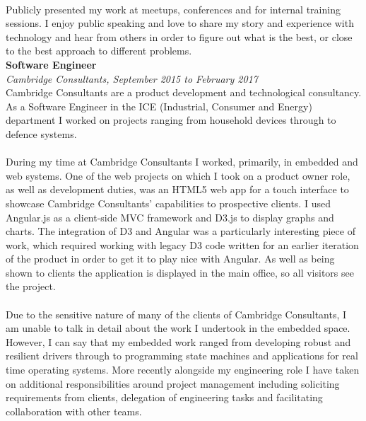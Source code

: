 \documentclass{article}
\begin{document}
\begin{flushleft}
\paragraph{} Publicly presented my work at meetups, conferences and for internal training sessions. I enjoy public speaking and love to share my story and experience with technology and hear from others in order to figure out what is the best, or close to the best approach to different problems.\\[10pt]

\textbf{Software Engineer}\\
\textit{Cambridge Consultants, September 2015 to February 2017}\\[5pt]
Cambridge Consultants are a product development and technological consultancy. As a Software Engineer in the ICE (Industrial, Consumer and Energy) department I worked on projects ranging from household devices through to defence systems.

\paragraph{}During my time at Cambridge Consultants I worked, primarily, in embedded and web systems. One of the web projects on which I took on a product owner role, as well as development duties, was an HTML5 web app for a touch interface to showcase Cambridge Consultants' capabilities to prospective clients. I used Angular.js as a client-side MVC framework and D3.js to display graphs and charts. The integration of D3 and Angular was a particularly interesting piece of work, which required working with legacy D3 code written for an earlier iteration of the product in order to get it to play nice with Angular. As well as being shown to clients the application is displayed in the main office, so all visitors see the project.

\paragraph{}Due to the sensitive nature of many of the clients of Cambridge Consultants, I am unable to talk in detail about the work I undertook in the embedded space. However, I can say that my embedded work ranged from developing robust and resilient drivers through to programming state machines and applications for real time operating systems. More recently alongside my engineering role I have taken on additional responsibilities around project management including soliciting requirements from clients, delegation of engineering tasks and facilitating collaboration with other teams.\\[10pt]


\end{flushleft}
\end{document}
